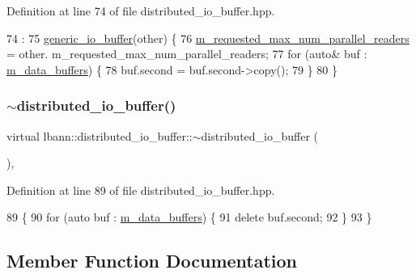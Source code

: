 Definition at line 74 of file distributed\+\_\+io\+\_\+buffer.\+hpp.


\begin{DoxyCode}
74                                                             :
75     \hyperlink{classlbann_1_1generic__io__buffer_a21e2ef867da6fb0fa334d751ae6b692f}{generic\_io\_buffer}(other) \{
76     \hyperlink{classlbann_1_1distributed__io__buffer_aa14580fd9d0e8806dc161745525a60dc}{m\_requested\_max\_num\_parallel\_readers} = other.
      m\_requested\_max\_num\_parallel\_readers;
77     \textcolor{keywordflow}{for} (\textcolor{keyword}{auto}& buf : \hyperlink{classlbann_1_1distributed__io__buffer_a59ef8621c57755f73671b782e11dbe89}{m\_data\_buffers}) \{
78       buf.second = buf.second->copy();
79     \}
80   \}
\end{DoxyCode}
\mbox{\label{classlbann_1_1distributed__io__buffer_ad55b621729dc0bfea498af2c232dc43c}} 
\subsubsection{\texorpdfstring{$\sim$distributed\+\_\+io\+\_\+buffer()}{~distributed\_io\_buffer()}}
{\footnotesize\ttfamily virtual lbann\+::distributed\+\_\+io\+\_\+buffer\+::$\sim$distributed\+\_\+io\+\_\+buffer (\begin{DoxyParamCaption}{ }\end{DoxyParamCaption})\hspace{0.3cm}{\ttfamily [inline]}, {\ttfamily [virtual]}}



Definition at line 89 of file distributed\+\_\+io\+\_\+buffer.\+hpp.


\begin{DoxyCode}
89                                    \{
90     \textcolor{keywordflow}{for} (\textcolor{keyword}{auto} buf : \hyperlink{classlbann_1_1distributed__io__buffer_a59ef8621c57755f73671b782e11dbe89}{m\_data\_buffers}) \{
91       \textcolor{keyword}{delete} buf.second;
92     \}
93   \}
\end{DoxyCode}


\subsection{Member Function Documentation}
\mbox{\label{classlbann_1_1distributed__io__buffer_af63a8b162ed869393c5b604c5913c631}} 
